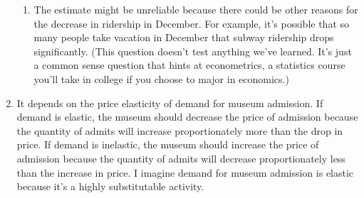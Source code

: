 \documentclass{article}
\begin{document}
\begin{enumerate}
\begin{enumerate}
	\item The estimate might be unreliable because there could be other reasons for the decrease in ridership in December. For example, it's possible that so many people take vacation in December that subway ridership drops significantly. (This question doesn't test anything we've learned. It's just a common sense question that hints at econometrics, a statistics course you'll take in college if you choose to major in economics.) 
	
	\end{enumerate}
	
\item It depends on the price elasticity of demand for museum admission. If demand is elastic, the museum should decrease the price of admission because the quantity of admits will increase proportionately more than the drop in price. If demand is inelastic, the museum should increase the price of admission because the quantity of admits will decrease proportionately less than the increase in price. I imagine demand for museum admission is elastic because it's a highly substitutable activity.

\end{enumerate}
\end{document}
